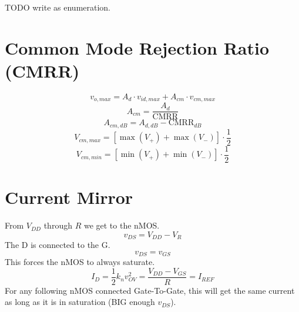 \documentclass[twocolumn]{article}
\begin{document}
      TODO write as enumeration.
  \section{Common Mode Rejection Ratio (CMRR)}
    $$v_{o,max} = A_d \cdot v_{id,max} + A_{cm} \cdot v_{cm,max}$$
    $$A_{cm} = \frac{A_d}{\text{CMRR}}$$
    $$A_{cm,dB} = A_{d,dB} - \text{CMRR}_{dB}$$
    $$V_{cm,max} = \left[\max(V_+) + \max(V_-) \right] \cdot \frac{1}{2}$$
    $$V_{cm,min} = \left[\min(V_+) + \min(V_-) \right] \cdot \frac{1}{2}$$
  \section{Current Mirror}
    From $V_{DD}$ through $R$ we get to the nMOS.
    $$v_{DS} = V_{DD} - V_R$$
    The D is connected to the G.
    $$v_{DS} = v_{GS}$$
    This forces the nMOS to always saturate.
    $$I_D = \frac{1}{2} k_n v_{OV}^2 = \frac{V_{DD} - V_{GS}}{R} = I_{REF}$$
    For any following nMOS connected Gate-To-Gate, this will get the same
    current as long as it is in saturation (BIG enough $v_{DS}$).
\end{document}

